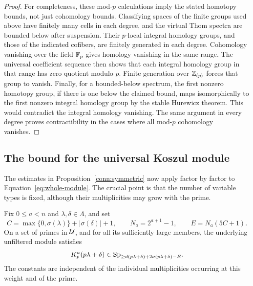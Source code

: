 \begin{proof}
For completeness, these mod-$p$ calculations imply the stated
homotopy bounds, not just cohomology bounds. Classifying spaces
of the finite groups used above have finitely many cells in
each degree, and the virtual Thom spectra are bounded below
after suspension. Their $p$-local integral homology groups,
and those of the indicated cofibers, are finitely generated in
each degree. Cohomology vanishing over the field $\mathbb F_p$ gives
homology vanishing in the same range. The universal coefficient
sequence then shows that each integral homology group in that
range has zero quotient modulo $p$. Finite generation over
$\mathbb Z_{(p)}$ forces that group to vanish. Finally, for a
bounded-below spectrum, the first nonzero homotopy group, if
there is one below the claimed bound, maps isomorphically to
the first nonzero integral homology group by the stable
Hurewicz theorem. This would contradict the integral homology
vanishing. The same argument in every degree proves
contractibility in the cases where all mod-$p$ cohomology
vanishes.
\end{proof}

\subsection{The bound for the universal Koszul module}

The estimates in Proposition~\ref{conn:symmetric} now apply
factor by factor to Equation~\eqref{eq:whole-module}. The crucial
point is that the number of variable types is fixed, although
their multiplicities may grow with the prime.

\begin{proposition}\label{conn:estimate}
Fix $0\leq a<n$ and $\lambda,\delta\in\Lambda$,
and set
\begin{equation}\label{conn:constants}
 C=\max\{0,\sigma(\lambda)\}+|\sigma(\delta)|+1,
 \qquad N_a=2^{a+1}-1,
 \qquad E=N_a(5C+1).
\end{equation}
On a set of primes in $\mathcal U$, and for all its sufficiently large
members, the underlying unfiltered module satisfies
\begin{equation}\label{conn:module-bound}
 K_p^a(p\lambda+\delta)
 \in\mathrm{Sp}_{\geq d(p\lambda+\delta)
                  +2\nu(p\lambda+\delta)-E}.
\end{equation}
The constants are independent of the individual multiplicities
occurring at this weight and of the prime.
\end{proposition}

